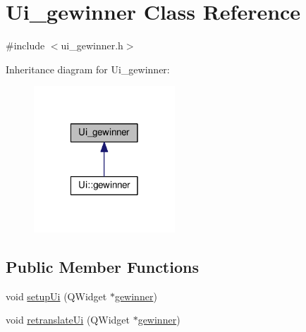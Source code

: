 \hypertarget{classUi__gewinner}{\section{Ui\-\_\-gewinner Class Reference}
\label{classUi__gewinner}
}


{\ttfamily \#include $<$ui\-\_\-gewinner.\-h$>$}



Inheritance diagram for Ui\-\_\-gewinner\-:\nopagebreak
\begin{figure}[H]
\begin{center}
\leavevmode
\includegraphics[width=150pt]{classUi__gewinner__inherit__graph}
\end{center}
\end{figure}
\subsection*{Public Member Functions}
\begin{DoxyCompactItemize}
\item 
void \hyperlink{classUi__gewinner_a3687bc57327c58675cbc709c9aac46a6}{setup\-Ui} (Q\-Widget $\ast$\hyperlink{classgewinner}{gewinner})
\item 
void \hyperlink{classUi__gewinner_a6a5e5d7907379f043cb022acb63ae316}{retranslate\-Ui} (Q\-Widget $\ast$\hyperlink{classgewinner}{gewinner})
\end{DoxyCompactItemize}
